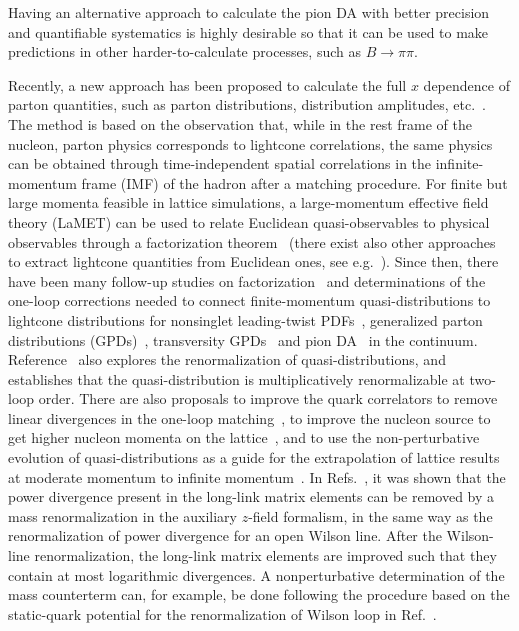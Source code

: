 Having an alternative approach to calculate the pion DA with better precision and quantifiable systematics is highly desirable so that it can be used to make predictions in other harder-to-calculate processes, such as $B\rightarrow \pi\pi$. 





Recently, a new approach has been proposed to calculate the full 
$x$ dependence of parton quantities, such as parton distributions, distribution amplitudes, etc.~\cite{Ji:2013dva}. The method is based on the observation
that, while in the rest frame of the nucleon, parton physics corresponds to
lightcone correlations, the same physics can be obtained through
time-independent spatial correlations in the infinite-momentum frame (IMF) of the hadron after a matching procedure. For
finite but large momenta feasible in lattice simulations, a large-momentum
effective field theory (LaMET) can be used to relate Euclidean
quasi-observables to physical observables through a factorization theorem~\cite{Ji:2014gla} (there exist also other approaches to extract lightcone quantities from Euclidean ones, see e.g.~\cite{Braun:2007wv,Liu:1993cv,Liu:1998um,Liu:1999ak,Liu:2016djw}). 
Since then, there have been many follow-up studies on factorization~\cite{Ma:2014jla} and determinations of the
one-loop corrections needed
to connect finite-momentum quasi-distributions to lightcone distributions 
for nonsinglet leading-twist PDFs~\cite{Xiong:2013bka}, generalized parton distributions (GPDs)~\cite{Ji:2015qla}, transversity GPDs~\cite{Xiong:2015nua} and pion DA~\cite{Ji:2015qla} in the continuum. Reference~\cite{Ji:2015jwa} also explores the renormalization of quasi-distributions, and establishes that the quasi-distribution is multiplicatively renormalizable at two-loop order. 
There are also proposals to improve the quark correlators to remove linear divergences in the one-loop matching~\cite{Li:2016amo}, to improve the nucleon source to get higher nucleon momenta on the lattice~\cite{Bali:2016lva}, and to use the non-perturbative evolution of quasi-distributions as a guide for the extrapolation of lattice results at moderate momentum to infinite momentum~\cite{Radyushkin:2016hsy,Radyushkin:2017gjd}. In Refs.~\cite{Ishikawa:2016znu,Chen:2016fxx}, it was shown that the power divergence present in the long-link matrix elements can be removed by a mass renormalization in the auxiliary $z$-field formalism, in the same way as the renormalization of power divergence for an open Wilson line. After the Wilson-line renormalization, the long-link matrix elements are improved such that they contain at most logarithmic divergences. A nonperturbative determination of the mass counterterm can, for example, be done following the procedure based on the static-quark potential for the renormalization of Wilson loop in Ref.~\cite{Musch:2010ka}. 

